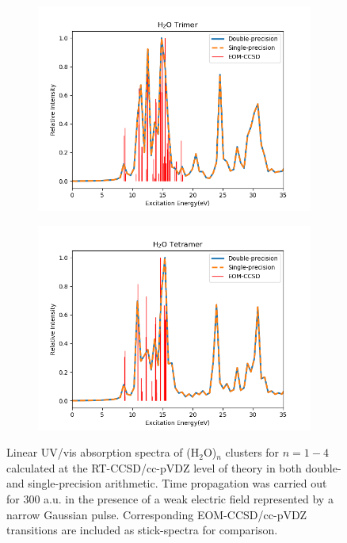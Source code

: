 \begin{figure}
\begin{subfigure}{0.475\textwidth}
         \includegraphics[width=\textwidth]{ch3/Figs/1-3.png}
         \label{fig:sp-trimer}
     \end{subfigure}
     \hfill
     \begin{subfigure}{0.475\textwidth}
         \centering
         \includegraphics[width=\textwidth]{ch3/Figs/1-4.png}
         \label{fig:sp-tetramer}
     \end{subfigure}
     \caption{Linear UV/vis absorption spectra of (H$_{2}$O)$_n$ clusters for
$n=1-4$ calculated at the RT-CCSD/cc-pVDZ level of theory in both double- and
single-precision arithmetic. Time propagation was carried out for 300 a.u. in
the presence of a weak electric field represented by a narrow Gaussian pulse.
Corresponding EOM-CCSD/cc-pVDZ transitions are included as stick-spectra for
comparison.}
     \label{fig:sp-spectrum}
\end{figure}


